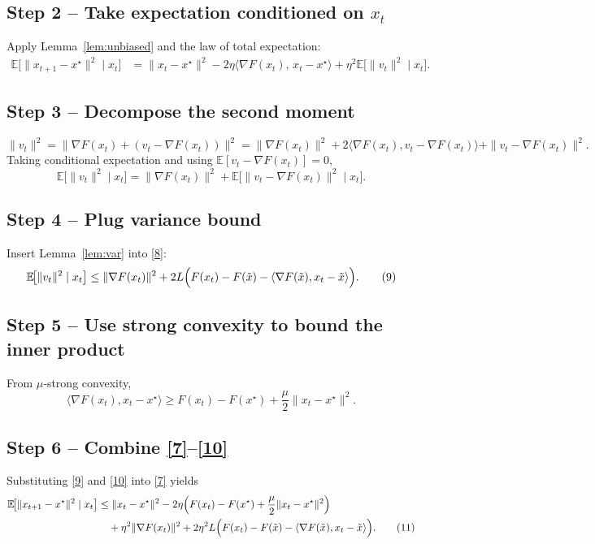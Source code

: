\documentclass[11pt]{article}
\newcommand{\E}{\mathbb{E}}
\begin{document}
\subsection*{Step 2 – Take expectation conditioned on $x_t$}
Apply Lemma~\ref{lem:unbiased} and the law of total expectation:
\[
\begin{aligned}
\E\!\bigl[\|x_{t+1}-x^\star\|^{2}\mid x_t\bigr]
&=\|x_t-x^\star\|^{2}
-2\eta\langle \nabla F(x_t),\,x_t-x^\star\rangle
+\eta^{2}\E\!\bigl[\|v_t\|^{2}\mid x_t\bigr]. \tag{7}
\end{aligned}
\]

\subsection*{Step 3 – Decompose the second moment}
\[
\|v_t\|^{2}
=\|\nabla F(x_t)+(v_t-\nabla F(x_t))\|^{2}
=\|\nabla F(x_t)\|^{2}+2\langle \nabla F(x_t),v_t-\nabla F(x_t)\rangle
+\|v_t-\nabla F(x_t)\|^{2}.
\]
Taking conditional expectation and using $\E[v_t-\nabla F(x_t)]=0$,
\[
\E\!\bigl[\|v_t\|^{2}\mid x_t\bigr]=\|\nabla F(x_t)\|^{2}
+\E\!\bigl[\|v_t-\nabla F(x_t)\|^{2}\mid x_t\bigr]. \tag{8}
\]

\subsection*{Step 4 – Plug variance bound}
Insert Lemma~\ref{lem:var} into \eqref{8}:
\[
\E\!\bigl[\|v_t\|^{2}\mid x_t\bigr]
\le \|\nabla F(x_t)\|^{2}
+2L\Bigl(F(x_t)-F(\tilde{x})-\langle\nabla F(\tilde{x}),x_t-\tilde{x}\rangle\Bigr). \tag{9}
\]

\subsection*{Step 5 – Use strong convexity to bound the inner product}
From $\mu$‑strong convexity,
\[
\langle \nabla F(x_t),x_t-x^\star\rangle
\ge F(x_t)-F(x^\star)+\frac{\mu}{2}\|x_t-x^\star\|^{2}. \tag{10}
\]

\subsection*{Step 6 – Combine \eqref{7}–\eqref{10}}
Substituting \eqref{9} and \eqref{10} into \eqref{7} yields
\[
\begin{aligned}
\E\!\bigl[\|x_{t+1}-x^\star\|^{2}\mid x_t\bigr]
&\le \|x_t-x^\star\|^{2}
-2\eta\Bigl(F(x_t)-F(x^\star)+\frac{\mu}{2}\|x_t-x^\star\|^{2}\Bigr)\\
&\quad +\eta^{2}\|\nabla F(x_t)\|^{2}
+2\eta^{2}L\Bigl(F(x_t)-F(\tilde{x})-\langle\nabla F(\tilde{x}),x_t-\tilde{x}\rangle\Bigr). \tag{11}
\end{aligned}
\]
\end{document}

